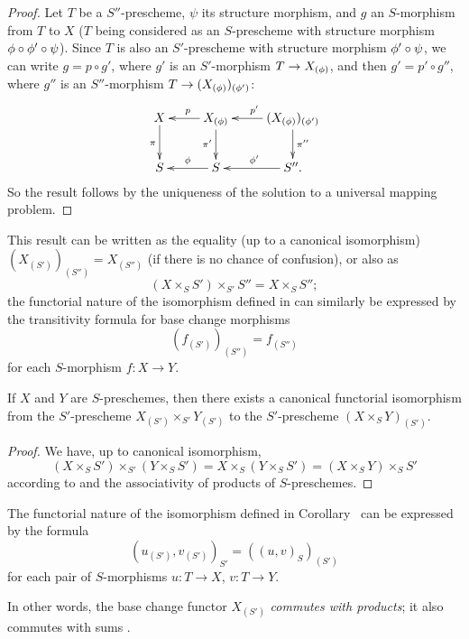 \begin{proof}
\label{proof-1.3.3.9}
Let $T$ be a $S''$-prescheme, $\psi$ its structure morphism, and $g$ an
$S$-morphism from $T$ to $X$ ($T$ being considered as an $S$-prescheme with
structure morphism $\phi\circ\phi'\circ\psi$). Since $T$ is also an $S'$-prescheme
with structure morphism $\phi'\circ\psi$, we can write $g=p\circ g'$, where
$g'$ is an $S'$-morphism $T\to X_{(\vphi)}$, and then $g'=p'\circ g''$, where
$g''$ is an $S''$-morphism $T\to(X_{(\vphi)})_{(\vphi')}$:
\[
  \xymatrix{
    X\ar[d]_\pi &
    X_{(\vphi)}\ar[l]_p\ar[d]_{\pi'} &
    (X_{(\vphi)})_{(\vphi')}\ar[l]_{p'}\ar[d]^{\pi''}\\
    S &
    S\ar[l]_\vphi &
    S''\ar[l]_{\vphi'}.
  }
\]
So the result follows by the uniqueness of the solution to a universal
mapping problem.
\end{proof}

This result can be written as the equality (up to a canonical isomorphism)
$(X_{(S')})_{(S'')}=X_{(S'')}$ (if there is no chance of confusion), or also as
\[
\label{1.3.3.9.1}
  (X\times_S S')\times_{S'}S''=X\times_S S'';
  \tag{3.3.9.1}
\]
the functorial nature of the isomorphism defined in  can
similarly be expressed by the transitivity formula for base change morphisms
\[
\label{1.3.3.9.2}
  (f_{(S')})_{(S'')}=f_{(S'')}
  \tag{3.3.9.2}
\]
for each $S$-morphism $f:X\to Y$.

\begin{corollary}[3.3.10]
\label{1.3.3.10}
If $X$ and $Y$ are $S$-preschemes, then there exists a canonical functorial
isomorphism from the $S'$-prescheme $X_{(S')}\times_{S'}Y_{(S')}$ to the
$S'$-prescheme $(X\times_S Y)_{(S')}$.
\end{corollary}

\begin{proof}
\label{proof-1.3.3.10}
We have, up to canonical isomorphism,
\[
  (X\times_S S')\times_{S'}(Y\times_S S')
  =X\times_S(Y\times_S S')=(X\times_S Y)\times_S S'
\]
according to  and the associativity of products of $S$-preschemes.
\end{proof}

The functorial nature of the isomorphism defined in
Corollary~ can be expressed by the formula
\[
\label{1.3.3.10.1}
  (u_{(S')},v_{(S')})_{S'}=((u,v)_S)_{(S')}
  \tag{3.3.10.1}
\]
for each pair of $S$-morphisms $u:T\to X$, $v:T\to Y$.

In other words, the base change functor $X_{(S')}$ \emph{commutes with
products}; it also commutes with sums .

